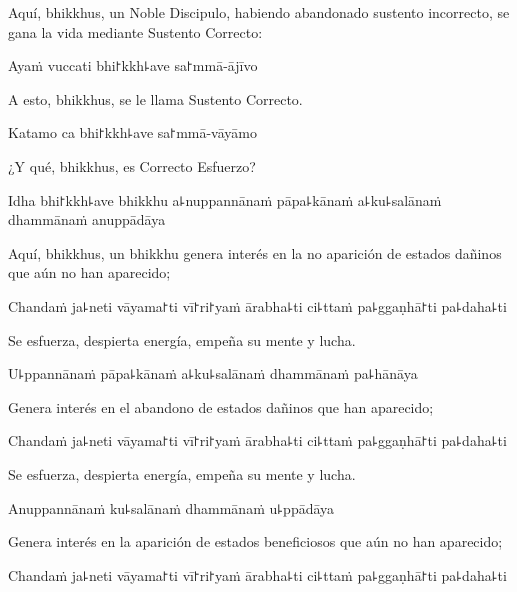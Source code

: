 \begin{english}
	Aquí, bhikkhus, un Noble Discipulo, habiendo abandonado sustento incorrecto, se gana la vida mediante Sustento Correcto:
\end{english}

Ayaṁ vuccati bhi꜓kkh꜕ave sa꜓mmā-ājīvo

\begin{english}
	A esto, bhikkhus, se le llama Sustento Correcto.
\end{english}

Katamo ca bhi꜓kkh꜕ave sa꜓mmā-vāyāmo

\begin{english}
	¿Y qué, bhikkhus, es Correcto Esfuerzo?
\end{english}

Idha bhi꜓kkh꜕ave bhikkhu a꜕nuppannānaṁ pāpa꜕kānaṁ a꜕ku꜕salānaṁ dhammānaṁ anuppādāya

\begin{english}
	Aquí, bhikkhus, un bhikkhu genera interés en la no aparición de estados dañinos que aún no han aparecido;
	
\end{english}

Chandaṁ ja꜕neti vāyama꜓ti vī꜓ri꜓yaṁ ārabha꜕ti ci꜕ttaṁ pa꜕ggaṇhā꜓ti pa꜕daha꜕ti

\begin{english}
	Se esfuerza, despierta energía, empeña su mente y lucha.
\end{english}

U꜕ppannānaṁ pāpa꜕kānaṁ a꜕ku꜕salānaṁ dhammānaṁ pa꜕hānāya

\begin{english}
	Genera interés en el abandono de estados dañinos que han aparecido;
\end{english}

Chandaṁ ja꜕neti vāyama꜓ti vī꜓ri꜓yaṁ ārabha꜕ti ci꜕ttaṁ pa꜕ggaṇhā꜓ti pa꜕daha꜕ti

\begin{english}
	Se esfuerza, despierta energía, empeña su mente y lucha.
\end{english}

Anuppannānaṁ ku꜕salānaṁ dhammānaṁ u꜕ppādāya

\begin{english}
	Genera interés en la aparición de estados beneficiosos que aún no han aparecido;
\end{english}

Chandaṁ ja꜕neti vāyama꜓ti vī꜓ri꜓yaṁ ārabha꜕ti ci꜕ttaṁ pa꜕ggaṇhā꜓ti pa꜕daha꜕ti

